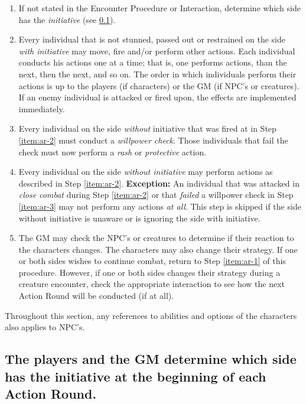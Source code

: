 \begin{enumerate}
\item If not stated in the Encounter Procedure or Interaction,
  determine which side has the \emph{initiative} (see
  \ref{sec:initiative}).\label{item:ar-1}
\item Every individual that is not stunned, passed out or restrained
  on the side \emph{with initiative} may move, fire and/or perform other
  actions. Each individual conducts his actions one at a time; that
  is, one performs actions, than the next, then the next, and so on.
  The order in which individuals perform their actions is up to the
  players (if characters) or the GM (if NPC's or creatures). If an
  enemy individual is attacked or fired upon, the effects are
  implemented immediately.\label{item:ar-2}
\item Every individual on the side \emph{without} initiative that was
  fired at in Step \ref{item:ar-2} must conduct a \emph{willpower check}. Those
  individuals that fail the check must now perform a \emph{rash} or
  \emph{protective} action.\label{item:ar-3}
\item Every individual on the side \emph{without initiative} may
  perform actions as described in Step \ref{item:ar-2}.
  \textbf{Exception:} An individual that was attacked in \emph{close
    combat} during Step \ref{item:ar-2} or that \emph{failed} a willpower
  check in Step \ref{item:ar-3} may not perform any actions \emph{at
    all}. This step is skipped if the side without initiative is
  unaware or is ignoring the side with initiative.\label{item:ar-4}
\item The GM may check the NPC's or creatures to determine if their
  reaction to the characters changes. The characters may also change
  their strategy. If one or both sides wishes to continue combat,
  return to Step \ref{item:ar-1} of this procedure. However, if one or both sides
  changes their strategy during a creature encounter, check the
  appropriate interaction to see how the next Action Round will be
  conducted (if at all).
\end{enumerate}

Throughout this section, any references to abilities and options of
the characters also applies to NPC's.


\subsection[Initiative]{The players and the GM determine which side has the
  initiative at the beginning of each Action Round.}
\label{sec:initiative}



